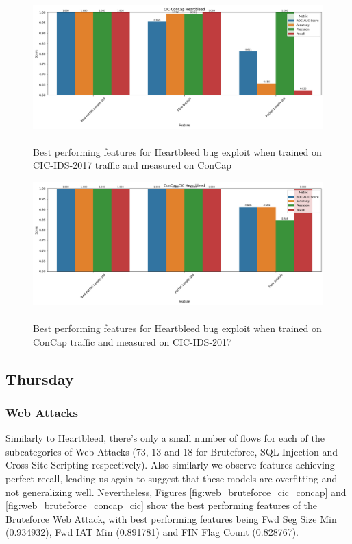 \begin{figure}
	\centering
	\includegraphics[width=1.2\linewidth]{images/heartbleed_cic_concap}
	\caption{\\Best performing features for Heartbleed bug exploit when trained on CIC-IDS-2017 traffic and measured on ConCap}
	\label{fig:heartbleed_cic_concap}
\end{figure}
\begin{figure}
	\centering
	\includegraphics[width=1.2\linewidth]{images/heartbleed_concap_cic}
	\caption{\\Best performing features for Heartbleed bug exploit when trained on ConCap traffic and measured on CIC-IDS-2017}
	\label{fig:heartbleed_concap_cic}
\end{figure}


\subsection{Thursday}

\subsubsection{Web Attacks}
Similarly to Heartbleed, there's only a small number of flows for each of the subcategories of Web Attacks (73, 13 and 18 for Bruteforce, SQL Injection and Cross-Site Scripting respectively). Also similarly we observe features achieving perfect recall, leading us again to suggest that these models are overfitting and not generalizing well. Nevertheless, Figures \ref{fig:web_bruteforce_cic_concap} and \ref{fig:web_bruteforce_concap_cic} show the best performing features of the Bruteforce Web Attack, with best performing features being Fwd Seg Size Min (0.934932), Fwd IAT Min (0.891781) and FIN Flag Count (0.828767).

